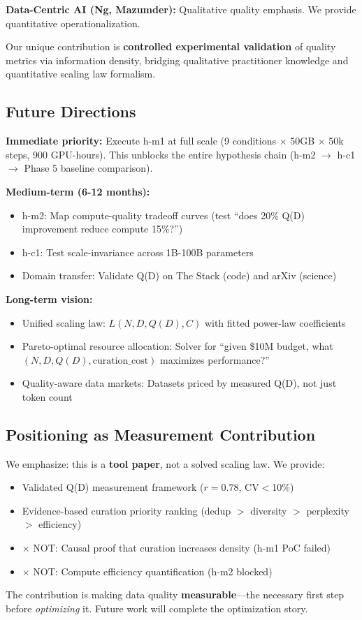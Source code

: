 \textbf{Data-Centric AI (Ng, Mazumder):} Qualitative quality emphasis. We provide quantitative operationalization.

Our unique contribution is \textbf{controlled experimental validation} of quality metrics via information density, bridging qualitative practitioner knowledge and quantitative scaling law formalism.

\subsection{Future Directions}

\textbf{Immediate priority:} Execute h-m1 at full scale (9 conditions $\times$ 50GB $\times$ 50k steps, 900 GPU-hours). This unblocks the entire hypothesis chain (h-m2 $\rightarrow$ h-c1 $\rightarrow$ Phase 5 baseline comparison).

\textbf{Medium-term (6-12 months):}
\begin{itemize}
\item h-m2: Map compute-quality tradeoff curves (test ``does 20\% Q(D) improvement reduce compute 15\%?'')
\item h-c1: Test scale-invariance across 1B-100B parameters
\item Domain transfer: Validate Q(D) on The Stack (code) and arXiv (science)
\end{itemize}

\textbf{Long-term vision:}
\begin{itemize}
\item Unified scaling law: $L(N, D, Q(D), C)$ with fitted power-law coefficients
\item Pareto-optimal resource allocation: Solver for ``given \$10M budget, what $(N, D, Q(D), \text{curation\_cost})$ maximizes performance?''
\item Quality-aware data markets: Datasets priced by measured Q(D), not just token count
\end{itemize}

\subsection{Positioning as Measurement Contribution}

We emphasize: this is a \textbf{tool paper}, not a solved scaling law. We provide:
\begin{itemize}
\item \checkmark{} Validated Q(D) measurement framework ($r=0.78$, CV$<$10\%)
\item \checkmark{} Evidence-based curation priority ranking (dedup $>$ diversity $>$ perplexity $>$ efficiency)
\item $\times$ NOT: Causal proof that curation increases density (h-m1 PoC failed)
\item $\times$ NOT: Compute efficiency quantification (h-m2 blocked)
\end{itemize}

The contribution is making data quality \textbf{measurable}---the necessary first step before \textit{optimizing} it. Future work will complete the optimization story.

